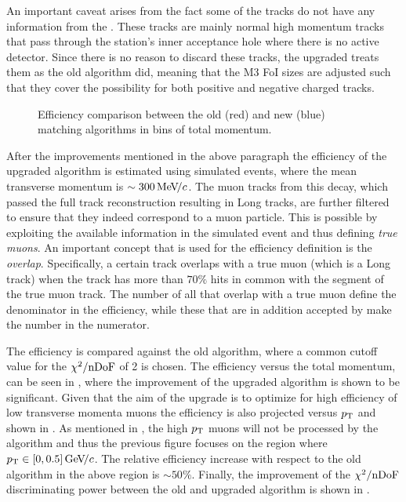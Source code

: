 An important caveat arises from the fact some of the \veloTTracks tracks do not have any information from
the \ttracker. These tracks are mainly normal high momentum tracks that pass through the \ttracker station's inner
acceptance hole where there is no active detector. Since there is no reason to discard these tracks, the upgraded
\mvTTm treats them as the old \mvm algorithm did, meaning that the M3 FoI sizes are adjusted such that they cover
the possibility for both positive and negative charged tracks.

\begin{figure}[t]
  \centering
    \scalebox{.6}{}
  \caption{Efficiency comparison between the old (red) and new (blue) matching algorithms in bins of total momentum.}
 \label{mvm_eff_p_comp}
\end{figure}

After the improvements mentioned in the above paragraph the efficiency of the upgraded \mvTTm algorithm
is estimated using simulated \Sigmapmumu events, where the mean transverse momentum is $\sim 300{\mathrm{\,Me\kern -0.1em V\!/}c}$.
The muon tracks from this decay, which passed the full track reconstruction resulting in Long tracks,
are further filtered to ensure that they indeed correspond to a muon particle. This is possible by
exploiting the available information in the simulated event and thus defining {\it true muons}.
An important concept that is used for the \mvTTm efficiency definition is the {\it overlap}.
Specifically, a certain \velo track overlaps with a true muon (which is a Long track)
when the \velo track has more than $70\%$ \velo hits in common with the \velo segment
of the true muon track. The number of all \veloTTracks that overlap with a true muon define the
denominator in the \mvTTm efficiency, while these \veloTTracks that are in addition accepted by
\mvTTm make the number in the numerator.

The efficiency is compared against the old
\mvm algorithm, where a common cutoff value for the $\chi^2/\rm nDoF$ of 2 is chosen. The efficiency
versus the total momentum, can be seen in , where the improvement of the
upgraded \mvTTm algorithm is shown to be significant.  Given that the aim of the \mvTTm upgrade
is to optimize for high efficiency of low transverse momenta muons the efficiency is also projected
versus $\mbox{$p_{\rm T}$}$ and shown in . As mentioned in , the
high $\mbox{$p_{\rm T}$}$ muons will not be processed by the \mvTTm algorithm and thus the previous figure focuses on
the region where $\mbox{$p_{\rm T}$}\in[0,0.5]{\mathrm{\,Ge\kern -0.1em V\!/}c}$. The relative efficiency increase with respect to the old
\mvm algorithm in the above region is $\sim 50\%$. Finally, the improvement of the $\chi^2/\rm nDoF$
discriminating power between the old and upgraded algorithm is shown in .

